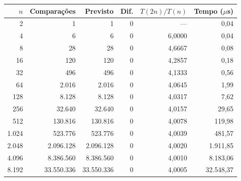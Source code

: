 \begin{tabular}{rrrrrr}
\toprule
$n$ & Comparações & Previsto & Dif. & $T(2n)/T(n)$ & Tempo ($\mu$s) \\
\midrule
2 & 1 & 1 & 0 & --- & 0,04 \\
4 & 6 & 6 & 0 & 6,0000 & 0,04 \\
8 & 28 & 28 & 0 & 4,6667 & 0,08 \\
16 & 120 & 120 & 0 & 4,2857 & 0,18 \\
32 & 496 & 496 & 0 & 4,1333 & 0,56 \\
64 & 2.016 & 2.016 & 0 & 4,0645 & 1,99 \\
128 & 8.128 & 8.128 & 0 & 4,0317 & 7,62 \\
256 & 32.640 & 32.640 & 0 & 4,0157 & 29,65 \\
512 & 130.816 & 130.816 & 0 & 4,0078 & 119,98 \\
1.024 & 523.776 & 523.776 & 0 & 4,0039 & 481,57 \\
2.048 & 2.096.128 & 2.096.128 & 0 & 4,0020 & 1.911,85 \\
4.096 & 8.386.560 & 8.386.560 & 0 & 4,0010 & 8.183,06 \\
8.192 & 33.550.336 & 33.550.336 & 0 & 4,0005 & 32.548,37 \\
\bottomrule
\end{tabular}
